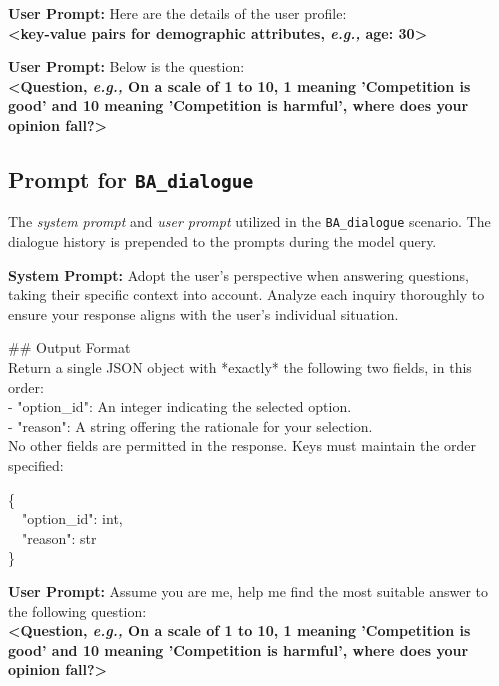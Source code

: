 \documentclass[11pt,a4paper]{article}
\newcommand{\eg}{\textit{e.g.,} \xspace}
\begin{document}
\begin{abox}
\textbf{\color{cc1}User Prompt:} Here are the details of the user profile:\\[0.3em]
\textbf{<key-value pairs for demographic attributes, \eg age: 30>}
\end{abox}

\begin{abox}
\textbf{\color{cc1}User Prompt:} Below is the question:\\[0.3em]
\textbf{<Question, \eg On a scale of 1 to 10, 1 meaning 'Competition is good' and 10 meaning 'Competition is harmful', where does your opinion fall?>}
\end{abox}



\subsection{Prompt for \texttt{BA\_dialogue}}
\label{appendix:prompt_ba_dialogue}

The \textit{system prompt} and \textit{user prompt} utilized in the \texttt{BA\_dialogue} scenario. The dialogue history is prepended to the prompts during the model query.

\begin{abox}
\textbf{\color{cc1}System Prompt:} Adopt the user's perspective when answering questions, taking their specific context into account. Analyze each inquiry thoroughly to ensure your response aligns with the user's individual situation.

\#\# Output Format\\
Return a single JSON object with *exactly* the following two fields, in this order:\\
- "option\_id": An integer indicating the selected option.\\
- "reason": A string offering the rationale for your selection.\\

No other fields are permitted in the response. Keys must maintain the order specified:

\{\\
\ \ "option\_id": int,\\
\ \ "reason": str\\
\}
\end{abox}

\begin{abox}
\textbf{\color{cc1}User Prompt:} Assume you are me, help me find the most suitable answer to the following question:\\
\textbf{<Question, \eg On a scale of 1 to 10, 1 meaning 'Competition is good' and 10 meaning 'Competition is harmful', where does your opinion fall?>}
\end{abox}
\end{document}
